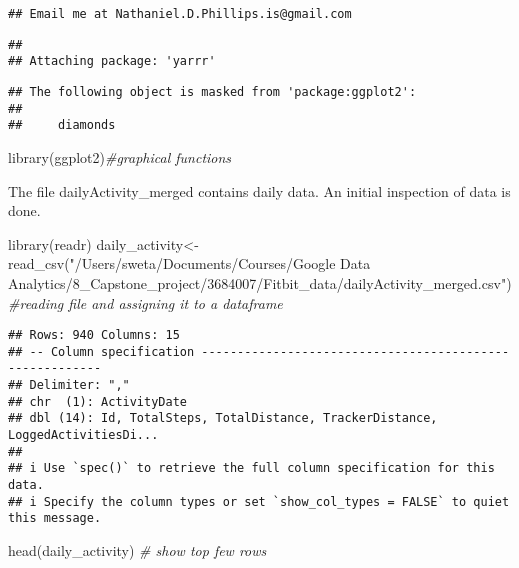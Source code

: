 \documentclass[
]{article}
\newenvironment{Shaded}{\begin{snugshade}}{\end{snugshade}}
\newcommand{\CommentTok}[1]{\textcolor[rgb]{0.56,0.35,0.01}{\textit{#1}}}
\newcommand{\FunctionTok}[1]{\textcolor[rgb]{0.00,0.00,0.00}{#1}}
\newcommand{\NormalTok}[1]{#1}
\newcommand{\OtherTok}[1]{\textcolor[rgb]{0.56,0.35,0.01}{#1}}
\newcommand{\StringTok}[1]{\textcolor[rgb]{0.31,0.60,0.02}{#1}}
\begin{document}
\begin{verbatim}
## Email me at Nathaniel.D.Phillips.is@gmail.com
\end{verbatim}

\begin{verbatim}
## 
## Attaching package: 'yarrr'
\end{verbatim}

\begin{verbatim}
## The following object is masked from 'package:ggplot2':
## 
##     diamonds
\end{verbatim}

\begin{Shaded}
\begin{Highlighting}[]
\FunctionTok{library}\NormalTok{(ggplot2)}\CommentTok{\#graphical functions}
\end{Highlighting}
\end{Shaded}

The file dailyActivity\_merged contains daily data. An initial
inspection of data is done.

\begin{Shaded}
\begin{Highlighting}[]
\FunctionTok{library}\NormalTok{(readr)}
\NormalTok{daily\_activity}\OtherTok{\textless{}{-}}\FunctionTok{read\_csv}\NormalTok{(}\StringTok{"/Users/sweta/Documents/Courses/Google Data Analytics/8\_Capstone\_project/3684007/Fitbit\_data/dailyActivity\_merged.csv"}\NormalTok{) }\CommentTok{\#reading file and assigning it to a dataframe}
\end{Highlighting}
\end{Shaded}

\begin{verbatim}
## Rows: 940 Columns: 15
## -- Column specification --------------------------------------------------------
## Delimiter: ","
## chr  (1): ActivityDate
## dbl (14): Id, TotalSteps, TotalDistance, TrackerDistance, LoggedActivitiesDi...
## 
## i Use `spec()` to retrieve the full column specification for this data.
## i Specify the column types or set `show_col_types = FALSE` to quiet this message.
\end{verbatim}

\begin{Shaded}
\begin{Highlighting}[]
\FunctionTok{head}\NormalTok{(daily\_activity) }\CommentTok{\# show top few rows}
\end{Highlighting}
\end{Shaded}
\end{document}
